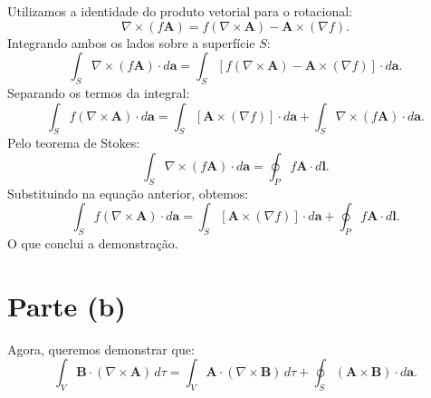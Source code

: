 \documentclass[a4paper,12pt]{article}
\begin{document}
Utilizamos a identidade do produto vetorial para o rotacional:
\begin{equation}
\nabla \times (f \mathbf{A}) = f (\nabla \times \mathbf{A}) - \mathbf{A} \times (\nabla f).
\end{equation}
Integrando ambos os lados sobre a superfície \( S \):
\begin{equation}
\int_S \nabla \times (f \mathbf{A}) \cdot d\mathbf{a} =
\int_S \left[ f (\nabla \times \mathbf{A}) - \mathbf{A} \times (\nabla f) \right] \cdot d\mathbf{a}.
\end{equation}
Separando os termos da integral:
\begin{equation}
\int_S f (\nabla \times \mathbf{A}) \cdot d\mathbf{a} =
\int_S [\mathbf{A} \times (\nabla f)] \cdot d\mathbf{a} +
\int_S \nabla \times (f \mathbf{A}) \cdot d\mathbf{a}.
\end{equation}
Pelo teorema de Stokes:
\begin{equation}
\int_S \nabla \times (f \mathbf{A}) \cdot d\mathbf{a} = \oint_P f \mathbf{A} \cdot d\mathbf{l}.
\end{equation}
Substituindo na equação anterior, obtemos:
\begin{equation}
\int_S f (\nabla \times \mathbf{A}) \cdot d\mathbf{a} =
\int_S [\mathbf{A} \times (\nabla f)] \cdot d\mathbf{a} + \oint_P f \mathbf{A} \cdot d\mathbf{l}.
\end{equation}
O que conclui a demonstração.

\section*{Parte (b)}

Agora, queremos demonstrar que:
\begin{equation}
\int_V \mathbf{B} \cdot (\nabla \times \mathbf{A}) \, d\tau =
\int_V \mathbf{A} \cdot (\nabla \times \mathbf{B}) \, d\tau +
\oint_S (\mathbf{A} \times \mathbf{B}) \cdot d\mathbf{a}.
\end{equation}
\end{document}
